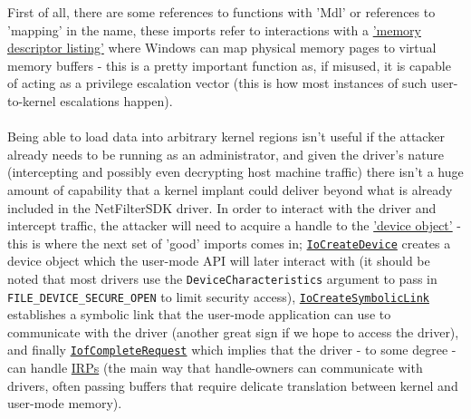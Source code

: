 First of all, there are some references to functions with 'Mdl' or references to 'mapping' in the name,
            these imports refer to interactions with a \href{https://learn.microsoft.com/en-us/windows-hardware/drivers/kernel/using-mdls}{'memory descriptor listing'}
            where Windows can map physical memory pages to virtual memory buffers - this is a pretty important function as, if misused,
            it is capable of acting as a privilege escalation vector (this is how most instances of such user-to-kernel escalations happen).
        \\
\\

            Being able to load data into arbitrary kernel regions isn't useful if the attacker already needs to be running as an administrator, and given
            the driver's nature (intercepting and possibly even decrypting host machine traffic) there isn't a huge amount of capability that a kernel
            implant could deliver beyond what is already included in the NetFilterSDK driver.
            In order to interact with the driver and intercept traffic, the attacker will need to acquire a handle to the
            \href{https://learn.microsoft.com/en-us/windows-hardware/drivers/kernel/introduction-to-device-objects}{'device object'} - this
            is where the next set of 'good' imports comes in; \texttt{\href{https://learn.microsoft.com/en-us/windows-hardware/drivers/ddi/wdm/nf-wdm-iocreatedevice}{IoCreateDevice}}
            creates a device object which the user-mode API will later interact with (it should be noted that most drivers use
            the \texttt{DeviceCharacteristics} argument to pass in \texttt{FILE\_DEVICE\_SECURE\_OPEN}
            to limit security access), \texttt{\href{https://learn.microsoft.com/en-us/windows-hardware/drivers/ddi/wdm/nf-wdm-iocreatesymboliclink}{IoCreateSymbolicLink}}
            establishes a symbolic link that the user-mode application can use to communicate with the driver (another great sign if we hope to access the driver), and finally
            \texttt{\href{https://learn.microsoft.com/en-us/windows-hardware/drivers/ddi/wdm/nf-wdm-iocompleterequest}{IofCompleteRequest}} which
            implies that the driver - to some degree - can handle \href{https://learn.microsoft.com/en-us/windows-hardware/drivers/gettingstarted/i-o-request-packets}{IRPs} (the main
            way that handle-owners can communicate with drivers, often passing buffers that require delicate translation between kernel and user-mode memory).

